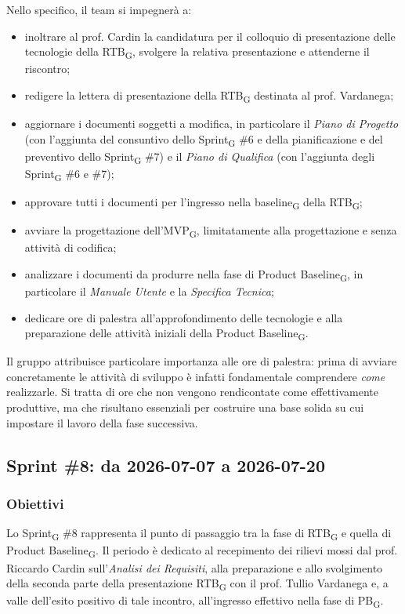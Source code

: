 ﻿\documentclass[a4paper, 10pt, colorlinks=true, linkcolor=black, urlcolor=blue, citecolor=blue, hidelinks]{article}
\begin{document}
Nello specifico, il team si impegnerà a:
\begin{itemize}
    \item inoltrare al prof. Cardin la candidatura per il colloquio di presentazione delle tecnologie della RTB\textsubscript{G}, svolgere la relativa presentazione e attenderne il riscontro;
    \item redigere la lettera di presentazione della RTB\textsubscript{G} destinata al prof. Vardanega;
    \item aggiornare i documenti soggetti a modifica, in particolare il \textit{Piano di Progetto} (con l'aggiunta del consuntivo dello Sprint\textsubscript{G} \#6 e della pianificazione e del preventivo dello Sprint\textsubscript{G} \#7) e il \textit{Piano di Qualifica} (con l'aggiunta degli Sprint\textsubscript{G} \#6 e \#7);
    \item approvare tutti i documenti per l'ingresso nella baseline\textsubscript{G} della RTB\textsubscript{G};
    \item avviare la progettazione dell'MVP\textsubscript{G}, limitatamente alla progettazione e senza attività di codifica;
    \item analizzare i documenti da produrre nella fase di Product Baseline\textsubscript{G}, in particolare il \textit{Manuale Utente} e la \textit{Specifica Tecnica};
    \item dedicare ore di palestra all'approfondimento delle tecnologie e alla preparazione delle attività iniziali della Product Baseline\textsubscript{G}.
\end{itemize}

Il gruppo attribuisce particolare importanza alle ore di palestra: prima di avviare concretamente le attività di sviluppo è infatti fondamentale comprendere \textit{come} realizzarle. Si tratta di ore che non vengono rendicontate come effettivamente produttive, ma che risultano essenziali per costruire una base solida su cui impostare il lavoro della fase successiva.

\subsection{Sprint \#8: da 2026-07-07 a 2026-07-20}

\subsubsection{Obiettivi}
Lo Sprint\textsubscript{G} \#8 rappresenta il punto di passaggio tra la fase di RTB\textsubscript{G} e quella di Product Baseline\textsubscript{G}. Il periodo è dedicato al recepimento dei rilievi mossi dal prof. Riccardo Cardin sull'\textit{Analisi dei Requisiti}, alla preparazione e allo svolgimento della seconda parte della presentazione RTB\textsubscript{G} con il prof. Tullio Vardanega e, a valle dell'esito positivo di tale incontro, all'ingresso effettivo nella fase di PB\textsubscript{G}.
\end{document}
